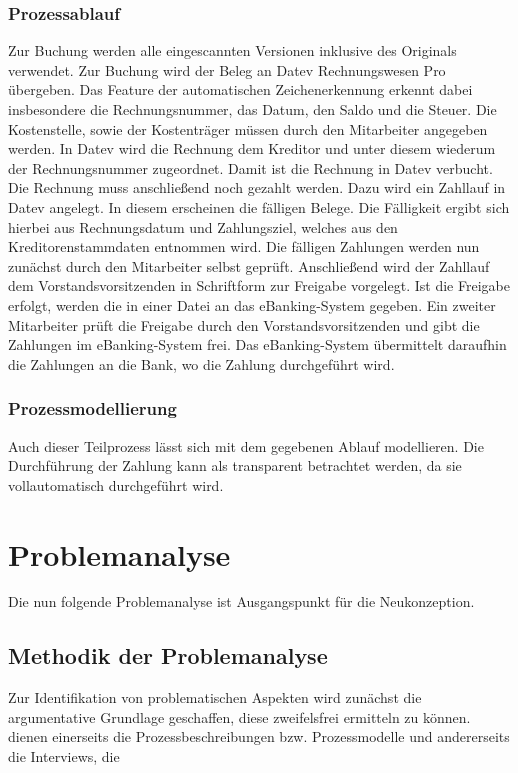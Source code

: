 \subsubsection{Prozessablauf}
Zur Buchung werden alle eingescannten Versionen inklusive des Originals verwendet.
Zur Buchung wird der Beleg an Datev Rechnungswesen Pro übergeben.
Das Feature der automatischen Zeichenerkennung erkennt dabei insbesondere die Rechnungsnummer, das Datum, den Saldo und die Steuer.
Die Kostenstelle, sowie der Kostenträger müssen durch den Mitarbeiter angegeben werden.
In Datev wird die Rechnung dem Kreditor und unter diesem wiederum der Rechnungsnummer zugeordnet.
Damit ist die Rechnung in Datev verbucht.\\
Die Rechnung muss anschließend noch gezahlt werden.
Dazu wird ein Zahllauf in Datev angelegt.
In diesem erscheinen die fälligen Belege. 
Die Fälligkeit ergibt sich hierbei aus Rechnungsdatum und Zahlungsziel, welches aus den Kreditorenstammdaten entnommen wird.
Die fälligen Zahlungen werden nun zunächst durch den Mitarbeiter selbst geprüft.
Anschließend wird der Zahllauf dem Vorstandsvorsitzenden in Schriftform zur Freigabe vorgelegt.
Ist die Freigabe erfolgt, werden die in einer Datei an das eBanking-System gegeben.
Ein zweiter Mitarbeiter prüft die Freigabe durch den Vorstandsvorsitzenden und gibt die Zahlungen im eBanking-System frei.
Das eBanking-System übermittelt daraufhin die Zahlungen an die Bank, wo die Zahlung durchgeführt wird.
\subsubsection{Prozessmodellierung}

Auch dieser Teilprozess lässt sich mit dem gegebenen Ablauf modellieren. 
Die Durchführung der Zahlung kann als transparent betrachtet werden, da sie vollautomatisch durchgeführt wird.





\section{Problemanalyse}
Die nun folgende Problemanalyse ist Ausgangspunkt für die Neukonzeption.

\subsection{Methodik der Problemanalyse}
Zur Identifikation von problematischen Aspekten wird zunächst die argumentative Grundlage geschaffen, diese zweifelsfrei ermitteln zu können.
 dienen einerseits die Prozessbeschreibungen bzw. Prozessmodelle und andererseits die Interviews, die 
